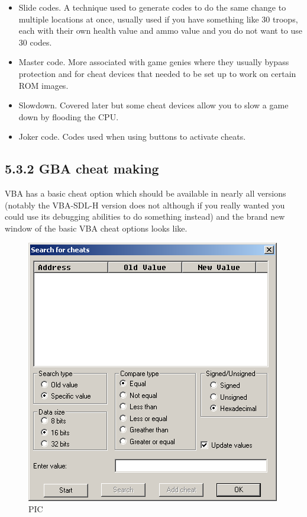 \documentclass[
]{book}
\providecommand{\tightlist}{%
  \setlength{\itemsep}{0pt}\setlength{\parskip}{0pt}}
\begin{document}
\begin{itemize}
\tightlist
\item
  Slide codes. A technique used to generate codes to do the same change to multiple locations at once, usually used if you have something like 30 troops, each with their own health value and ammo value and you do not want to use 30 codes.
\item
  Master code. More associated with game genies where they usually bypass protection and for cheat devices that needed to be set up to work on certain ROM images.
\item
  Slowdown. Covered later but some cheat devices allow you to slow a game down by flooding the CPU.
\item
  Joker code. Codes used when using buttons to activate cheats.
\end{itemize}

\hypertarget{gba-cheat-making}{%
\subsection{5.3.2 GBA cheat making}\label{gba-cheat-making}}

VBA has a basic cheat option which should be available in nearly all versions (notably the VBA-SDL-H version does not although if you really wanted you could use its debugging abilities to do something instead) and the brand new window of the basic VBA cheat options looks like.

\begin{figure}
\centering
\includegraphics{images/194_home_fast6191_romhackingguide_unrenamed_files_and_original_borders_romhackingguideGBAcheat.png}
\caption{PIC}
\end{figure}
\end{document}

